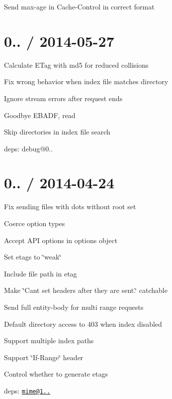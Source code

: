 \begin{DoxyItemize}
\item Send {\ttfamily max-\/age} in {\ttfamily Cache-\/\+Control} in correct format
\end{DoxyItemize}

\section*{0.. / 2014-\/05-\/27 }


\begin{DoxyItemize}
\item Calculate E\+Tag with md5 for reduced collisions
\item Fix wrong behavior when index file matches directory
\item Ignore stream errors after request ends
\begin{DoxyItemize}
\item Goodbye {\ttfamily E\+B\+A\+D\+F, read}
\end{DoxyItemize}
\item Skip directories in index file search
\item deps\+: debug@0..
\end{DoxyItemize}

\section*{0.. / 2014-\/04-\/24 }


\begin{DoxyItemize}
\item Fix sending files with dots without root set
\item Coerce option types
\item Accept A\+P\+I options in options object
\item Set etags to \char`\"{}weak\char`\"{}
\item Include file path in etag
\item Make \char`\"{}\+Can\textquotesingle{}t set headers after they are sent.\char`\"{} catchable
\item Send full entity-\/body for multi range requests
\item Default directory access to 403 when index disabled
\item Support multiple index paths
\item Support \char`\"{}\+If-\/\+Range\char`\"{} header
\item Control whether to generate etags
\item deps\+: \href{mailto:mime@1.2.11}{\tt mime@1..}
\end{DoxyItemize}

